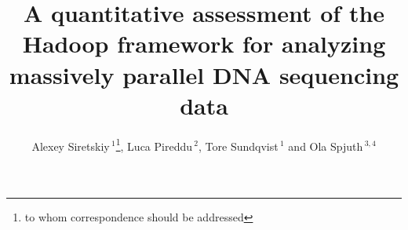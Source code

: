 \documentclass{bioinfo}
\begin{document}

\title[Hadoop for analyzing DNA sequence data]{A quantitative assessment of the Hadoop framework for analyzing massively parallel DNA sequencing data}
\author[Alexey Siretskiy]{Alexey Siretskiy\,$^1$\footnote{to whom correspondence should be addressed}, Luca Pireddu\,$^{2}$, Tore Sundqvist\,$^1$ and Ola Spjuth\,$^{3,4}$}
\address{$^{1}$Department of Information Technology, Uppsala University, Uppsala, Sweden\\
$^{2}$CRS4, Polaris, Pula, Italy\\
$^{3}$Department of Pharmaceutical Biosciences, Uppsala University, Uppsala, Sweden\\
$^{4}$Science for Life Laboratory, Uppsala University, Uppsala, Sweden}





\maketitle
\end{document}
